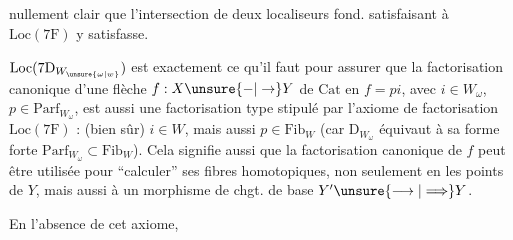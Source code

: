 nullement clair que l'intersection de deux localiseurs fond. satisfaisant à $\mathrm{Loc}(7\mathrm{F})$ y satisfasse.

$\mathrm{Loc}(7\mathrm{D}_{W_{\unsure{\omega|w}}})$ est exactement ce qu'il faut pour assurer que la factorisation canonique d'une flèche $f:X\unsure{-|\to}Y$ de $\mathrm{Cat}$ en $f=pi$, avec $i\in W_\omega$, $p\in\mathrm{Parf}_{W_\omega}$, est aussi une factorisation   type stipulé par l'axiome de factorisation $\mathrm{Loc}(7\mathrm{F})$ :  (bien sûr) $i\in W$, mais aussi $p\in\mathrm{Fib}_W$ (car $\mathrm{D}_{W_\omega}$ équivaut à sa forme forte $\mathrm{Parf}_{W_\omega}\subset\mathrm{Fib}_W$). Cela signifie aussi que la factorisation canonique de $f$ peut être utilisée pour ``calculer'' ses fibres homotopiques, non seulement en les points de $Y$, mais aussi  à un morphisme de chgt. de base $Y'\unsure{\longrightarrow|\Longrightarrow}Y$. 

En l'absence de cet axiome,
